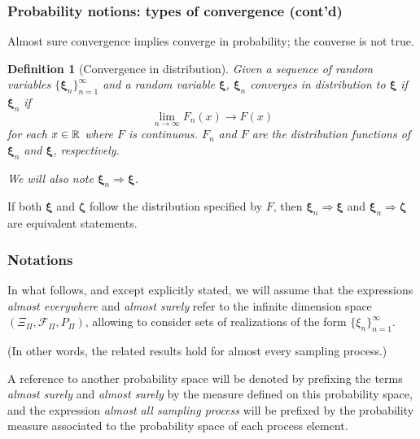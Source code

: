 \documentclass{beamer}
\newtheorem{defi}{Definition}
\def\bxi{\boldsymbol\xi}
\begin{document}
\begin{frame}
\frametitle{Probability notions: types of convergence (cont'd)}

Almost sure convergence implies converge in probability; the converse is not true.

\begin{defi}[Convergence in distribution]
Given a sequence of random variables $\lbrace \bxi_n \rbrace_{n=1}^{\infty}$ and a random variable $\bxi$, $\bxi_n$ converges in distribution to $\bxi$ if $\bxi_n$ if
$$
\lim_{n \rightarrow \infty} F_n(x) \rightarrow F(x)
$$
for each $x \in %
\rit$ %
where $F$ is continuous. $F_n$ and $F$ are the distribution functions of $\bxi_n$ and $\bxi$, respectively.

\mbox{}

We will also note $\bxi_n \Rightarrow \bxi$.
\end{defi}

\mbox{}

If both $\bxi$ and $\boldsymbol{\zeta}$ follow the distribution specified by $F$, then $\bxi_n \Rightarrow \bxi$ and $\bxi_n \Rightarrow \boldsymbol{\zeta}$ are equivalent statements.

\end{frame}

\begin{frame}
\frametitle{Notations}

In what follows, and except explicitly stated, we will assume that the expressions  \textsl{\blue almost everywhere} and \textsl{\blue almost surely} refer to the infinite dimension space  $\left( \Xi_{\Pi}, \mathcal{F}_{\Pi}, P_{\Pi} \right)$, allowing to %
consider sets of realizations %
of the form $\{\xi_n\}_{n=1}^{\infty}$.

\mbox{}

(In other words, the related results hold for almost every sampling process.)

\mbox{}

A reference to another probability space will be denoted by prefixing the terms \textsl{almost surely} and \textsl{almost surely} by the measure defined on this probability space, and the expression \textsl{almost all sampling process} will be prefixed by the probability measure associated to the probability space of each process element.

\end{frame}
\end{document}
